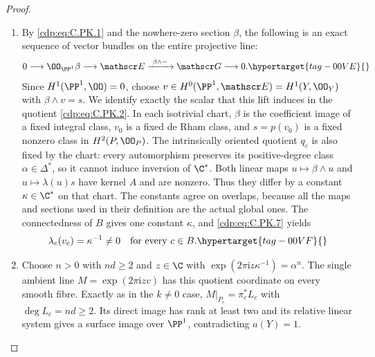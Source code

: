 \begin{proof}
\begin{enumerate}[leftmargin=*]
\item By \eqref{cdp:eq:C.PK.1} and the nowhere-zero section $\beta$, the
following is an exact sequence of vector bundles on the
entire projective line:
\begin{equation}
 0\longrightarrow\OO_{\PP^1}\beta
  \longrightarrow\mathscr E
  \xrightarrow{\ \beta\wedge-\ }\mathscr G
  \longrightarrow0.
\hypertarget{tag-00VE}{}\label{cdp:eq:C.PK.7}
\end{equation}
Since $H^1(\PP^1,\OO)=0$, choose
$v\in H^0(\PP^1,\mathscr E)=H^1(Y,\OO_Y)$ with
$\beta\wedge v=s$.
We identify exactly the scalar that this lift induces in
the quotient \eqref{cdp:eq:C.PK.2}. In each isotrivial chart,
$\beta$ is the coefficient image of a fixed integral
class, $v_0$ is a fixed de Rham class, and $s=p(v_0)$
is a fixed nonzero class in $H^2(P,\OO_P)$.
The intrinsically oriented quotient $q_c$ is also fixed
by the chart: every automorphism preserves its
positive-degree class $\alpha\in\Delta^*$, so it cannot
induce inversion of $\C^*$.
Both linear maps $u\mapsto\beta\wedge u$ and
$u\mapsto\lambda(u)s$ have kernel $A$ and are nonzero.
Thus they differ by a constant $\kappa\in\C^*$ on
that chart. The constants agree on overlaps, because
all the maps and sections used in their definition are
the actual global ones. The connectedness of $B$ gives
one constant $\kappa$, and \eqref{cdp:eq:C.PK.7} yields
\begin{equation}
 \lambda_c(v_c)=\kappa^{-1}\ne0
 \quad\hbox{for every }c\in B.
\hypertarget{tag-00VF}{}\label{cdp:eq:C.PK.8}
\end{equation}

\item Choose $n>0$ with $nd\ge2$ and $z\in\C$ with
$\exp(2\pi\mathrm i z\kappa^{-1})=\alpha^n$.
The single ambient line $M=\exp(2\pi\mathrm i z v)$
has this quotient coordinate on every smooth fibre.
Exactly as in the $k\ne0$ case,
$M|_{P_c}=\pi_c^*L_c$ with $\deg L_c=nd\ge2$.
Its direct image has rank at least two and its relative
linear system gives a surface image over $\PP^1$,
contradicting $a(Y)=1$.

\end{enumerate}
\end{proof}